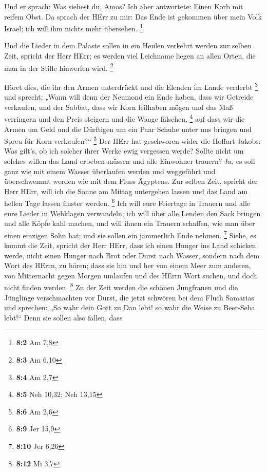  Und er sprach: Was siehest du, Amos? Ich aber antwortete:
Einen Korb mit reifem Obst. Da sprach der HErr zu mir: Das Ende ist
gekommen über mein Volk Israel; ich will ihm nichts mehr übersehen.
\footnote{\textbf{8:2} Am 7,8}

 Und die Lieder in dem Palaste sollen in ein Heulen verkehrt
werden zur selben Zeit, spricht der Herr HErr; es werden viel Leichname
liegen an allen Orten, die man in der Stille hinwerfen wird. \footnote{\textbf{8:3}
  Am 6,10}

 Höret dies, die ihr den Armen unterdrückt und die Elenden
im Lande verderbt \footnote{\textbf{8:4} Am 2,7}  und
sprecht: „Wann will denn der Neumond ein Ende haben, dass wir Getreide
verkaufen, und der Sabbat, dass wir Korn feilhaben mögen und das Maß
verringern und den Preis steigern und die Waage fälschen, \footnote{\textbf{8:5}
  Neh 10,32; Neh 13,15}  auf dass wir die Armen um Geld und
die Dürftigen um ein Paar Schuhe unter uns bringen und Spreu für Korn
verkaufen?{}`` \footnote{\textbf{8:6} Am 2,6}  Der HErr hat
geschworen wider die Hoffart Jakobs: Was gilt's, ob ich solcher ihrer
Werke ewig vergessen werde?  Sollte nicht um solches willen
das Land erbeben müssen und alle Einwohner trauern? Ja, es soll ganz wie
mit einem Wasser überlaufen werden und weggeführt und überschwemmt
werden wie mit dem Fluss Ägyptens.  Zur selben Zeit, spricht
der Herr HErr, will ich die Sonne am Mittag untergehen lassen und das
Land am hellen Tage lassen finster werden. \footnote{\textbf{8:9} Jer
  15,9}  Ich will eure Feiertage in Trauern und alle eure
Lieder in Wehklagen verwandeln; ich will über alle Lenden den Sack
bringen und alle Köpfe kahl machen, und will ihnen ein Trauern schaffen,
wie man über einen einzigen Sohn hat; und sie sollen ein jämmerlich Ende
nehmen. \footnote{\textbf{8:10} Jer 6,26}  Siehe, es kommt
die Zeit, spricht der Herr HErr, dass ich einen Hunger ins Land schicken
werde, nicht einen Hunger nach Brot oder Durst nach Wasser, sondern nach
dem Wort des HErrn, zu hören;  dass sie hin und her von
einem Meer zum anderen, von Mitternacht gegen Morgen umlaufen und des
HErrn Wort suchen, und doch nicht finden werden. \footnote{\textbf{8:12}
  Mi 3,7}  Zu der Zeit werden die schönen Jungfrauen und
die Jünglinge verschmachten vor Durst,  die jetzt schwören
bei dem Fluch Samarias und sprechen: „So wahr dein Gott zu Dan lebt! so
wahr die Weise zu Beer-Seba lebt!{}`` Denn sie sollen also fallen, dass
